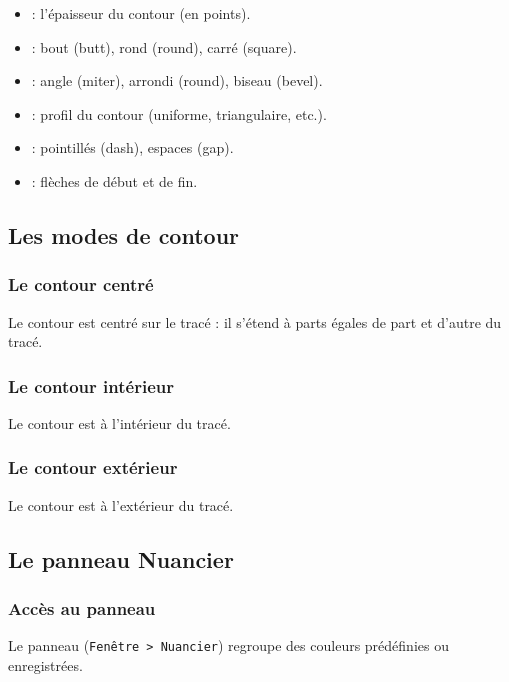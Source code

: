 \begin{itemize}
    \item {} : l'épaisseur du contour (en points).
    \item {} : bout (butt), rond (round), carré (square).
    \item {} : angle (miter), arrondi (round), biseau (bevel).
    \item {} : profil du contour (uniforme, triangulaire, etc.).
    \item {} : pointillés (dash), espaces (gap).
    \item {} : flèches de début et de fin.
\end{itemize}

\subsection{Les modes de contour}

\subsubsection{Le contour centré}

Le contour est centré sur le tracé : il s'étend à parts égales de part et d'autre du tracé.

\subsubsection{Le contour intérieur}

Le contour est à l'intérieur du tracé.

\subsubsection{Le contour extérieur}

Le contour est à l'extérieur du tracé.

\subsection{Le panneau Nuancier}

\subsubsection{Accès au panneau}

Le panneau  (\texttt{Fenêtre > Nuancier}) regroupe des couleurs prédéfinies ou enregistrées.

